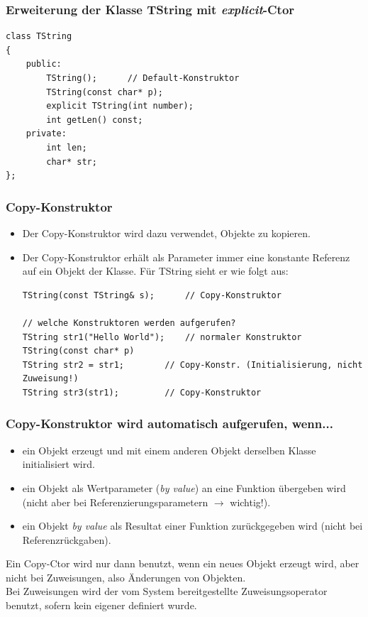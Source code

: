 \subsubsection{Erweiterung der Klasse TString mit \emph{explicit}-Ctor}
\vspace{-\baselineskip}
\begin{minipage}{0.5\linewidth}
\begin{lstlisting}
class TString
{
	public:
		TString();		// Default-Konstruktor
		TString(const char* p);
		explicit TString(int number);
		int getLen() const;
	private:
		int len;
		char* str;
};
\end{lstlisting}
\end{minipage}

\subsubsection{Copy-Konstruktor}
\begin{itemize}
	\item Der Copy-Konstruktor wird dazu verwendet, Objekte zu kopieren.
	\item Der Copy-Konstruktor erhält als Parameter immer eine konstante Referenz auf ein Objekt der Klasse. Für TString sieht er wie folgt aus:\\
	\vspace{-\baselineskip}
	\begin{minipage}{\linewidth}
\begin{lstlisting}
TString(const TString& s);		// Copy-Konstruktor

// welche Konstruktoren werden aufgerufen?
TString str1("Hello World");	// normaler Konstruktor TString(const char* p)
TString str2 = str1;		// Copy-Konstr. (Initialisierung, nicht Zuweisung!)
TString str3(str1);			// Copy-Konstruktor
\end{lstlisting}
	\end{minipage}
\end{itemize}

\subsubsection{Copy-Konstruktor wird automatisch aufgerufen, wenn...}
\begin{itemize}
	\item ein Objekt erzeugt und mit einem anderen Objekt derselben Klasse initialisiert wird.
	\item ein Objekt als Wertparameter (\emph{by value}) an eine Funktion übergeben wird (nicht aber bei Referenzierungsparametern $\rightarrow$ wichtig!).
	\item ein Objekt \emph{by value} als Resultat einer Funktion zurückgegeben wird (nicht bei Referenzrückgaben).
\end{itemize}
\begin{hinweis}
Ein Copy-Ctor wird nur dann benutzt, wenn ein neues Objekt erzeugt wird, aber nicht bei Zuweisungen, also Änderungen von Objekten.\\
Bei Zuweisungen wird der vom System bereitgestellte Zuweisungsoperator benutzt, sofern kein eigener definiert wurde.
\end{hinweis}

